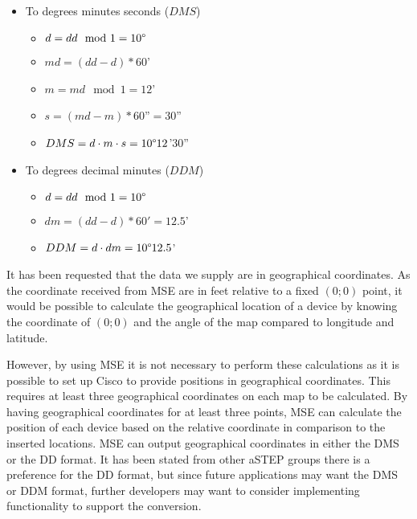 \begin{itemize}
\begin{itemize}
		\item To degrees minutes seconds ($DMS$)
		\begin{itemize}
			\setlength\itemsep{0.00005em}
			\item $ d = dd \mod 1 = 10\degree $
			\item $ md = (dd - d) * 60$' 
			\item $ m = md \mod 1 = 12$' 
			\item $ s = (md - m) * 60$''$ = 30$''
			\item $ DMS = d \cdot m \cdot s = 10\degree 12$'$ 30$'' 
		\end{itemize}
		\item To degrees decimal minutes ($DDM$)
		\begin{itemize}
			\setlength\itemsep{0.00005em}
			\item $ d = dd \mod 1 = 10\degree $
			\item $ dm = (dd - d) * 60' = 12.5$'
			\item $ DDM = d \cdot dm = 10\degree 12.5$'
		\end{itemize}
	\end{itemize}
\end{itemize}

It has been requested that the data we supply are in geographical coordinates.
As the coordinate received from MSE are in feet relative to a fixed $(0;0)$ point, it would be possible to calculate the geographical location of a device by knowing the coordinate of $(0;0)$ and the angle of the map compared to longitude and latitude. 

However, by using MSE it is not necessary to perform these calculations as it is possible to set up Cisco to provide positions in geographical coordinates. This requires at least three geographical coordinates on each map to be calculated. By having geographical coordinates for at least three points, MSE can calculate the position of each device based on the relative coordinate in comparison to the inserted locations\cite{geo_cisco}. 
MSE can output geographical coordinates in either the DMS or the DD format\cite{cisco_geo_type}. It has been stated from other aSTEP groups there is a preference for the DD format, but since future applications may want the DMS or DDM format, further developers may want to consider implementing functionality to support the conversion.